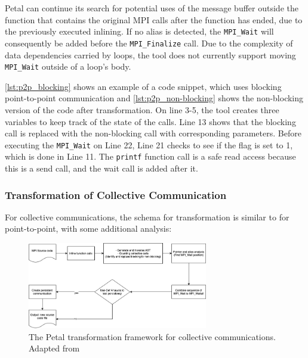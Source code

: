 Petal can continue its search for potential uses of the message buffer outside the function that contains the original MPI calls after the function has ended, due to the previously executed inlining.  
If no alias is detected, the \texttt{MPI\_Wait} will consequently be added before the \texttt{MPI\_Finalize} call. 
Due to the complexity of data dependencies carried by loops, the tool does not currently support moving \texttt{MPI\_Wait} outside of a loop's body.



\autoref{lst:p2p_blocking} shows an example of a code snippet, which uses blocking point-to-point communication and \autoref{lst:p2p_non-blocking} shows the non-blocking version of the code after transformation.
On line 3-5, the tool creates three variables to keep track of the state of the calls. Line 13 shows that the blocking call is replaced with the non-blocking call with corresponding parameters. Before executing the \texttt{MPI\_Wait} on Line 22, 
Line 21 checks to see if the flag is set to 1, which is done in Line 11. The \texttt{printf} function call is a safe read access because this is a send call, and the wait call is added after it.




\subsubsection{Transformation of Collective Communication}
\label{sssec:collective_communication}
For collective communications, the schema for transformation is similar to for point-to-point, with some additional analysis:

\begin{figure}[!h]
    \centering
    \includegraphics[width=0.7\textwidth]{pictures/petal_collective-workflow.png}
    \caption{The Petal transformation framework for collective communications. Adapted from \cite{ahmed_transforming_2017}}
    \label{fig:petal-collective-workflow}
\end{figure}

